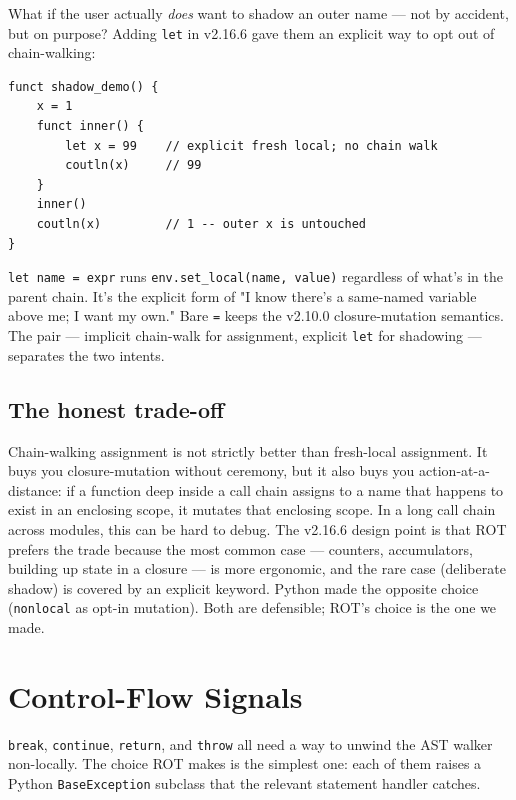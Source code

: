 \documentclass[11pt]{article}
\begin{document}
What if the user actually \emph{does} want to shadow an outer name --- not by accident, but on purpose? Adding \texttt{let} in v2.16.6 gave them an explicit way to opt out of chain-walking:

\begin{lstlisting}[style=rotstyle]
funct shadow_demo() {
    x = 1
    funct inner() {
        let x = 99    // explicit fresh local; no chain walk
        coutln(x)     // 99
    }
    inner()
    coutln(x)         // 1 -- outer x is untouched
}
\end{lstlisting}

\texttt{let name = expr} runs \texttt{env.set\_local(name, value)} regardless of what's in the parent chain. It's the explicit form of "I know there's a same-named variable above me; I want my own." Bare \texttt{=} keeps the v2.10.0 closure-mutation semantics. The pair --- implicit chain-walk for assignment, explicit \texttt{let} for shadowing --- separates the two intents.

\subsection{The honest trade-off}

Chain-walking assignment is not strictly better than fresh-local assignment. It buys you closure-mutation without ceremony, but it also buys you action-at-a-distance: if a function deep inside a call chain assigns to a name that happens to exist in an enclosing scope, it mutates that enclosing scope. In a long call chain across modules, this can be hard to debug. The v2.16.6 design point is that ROT prefers the trade because the most common case --- counters, accumulators, building up state in a closure --- is more ergonomic, and the rare case (deliberate shadow) is covered by an explicit keyword. Python made the opposite choice (\texttt{nonlocal} as opt-in mutation). Both are defensible; ROT's choice is the one we made.

\section{Control-Flow Signals}

\texttt{break}, \texttt{continue}, \texttt{return}, and \texttt{throw} all need a way to unwind the AST walker non-locally. The choice ROT makes is the simplest one: each of them raises a Python \texttt{BaseException} subclass that the relevant statement handler catches.
\end{document}
